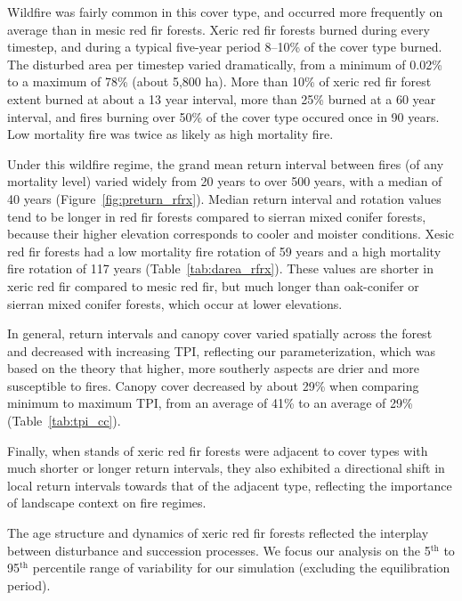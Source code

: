 Wildfire was fairly common in this cover type, and occurred more frequently on average than in mesic red fir forests. Xeric red fir forests burned during every timestep, and during a typical five-year period 8--10\% of the cover type burned. The disturbed area per timestep varied dramatically, from a minimum of 0.02\% to a maximum of 78\% (about 5,800 ha). More than 10\% of xeric red fir forest extent burned at about a 13 year interval, more than 25\% burned at a 60 year interval, and fires burning over 50\% of the cover type occured once in 90 years. Low mortality fire was twice as likely as high mortality fire.

Under this wildfire regime, the grand mean return interval between fires (of any mortality level) varied widely from 20 years to over 500 years, with a median of 40 years (Figure~\ref{fig:preturn_rfrx}). Median return interval and rotation values tend to be longer in red fir forests compared to sierran mixed conifer forests, because their higher elevation corresponds to cooler and moister conditions. Xesic red fir forests had a low mortality fire rotation of 59 years and a high mortality fire rotation of 117 years (Table~\ref{tab:darea_rfrx}). These values are shorter in xeric red fir compared to mesic red fir, but much longer than oak-conifer or sierran mixed conifer forests, which occur at lower elevations. 

In general, return intervals and canopy cover varied spatially across the forest and decreased with increasing TPI, reflecting our parameterization, which was based on the theory that higher, more southerly aspects are drier and more susceptible to fires. Canopy cover decreased by about 29\% when comparing minimum to maximum TPI, from an average of 41\% to an average of 29\% (Table~\ref{tab:tpi_cc}). 

Finally, when stands of xeric red fir forests were adjacent to cover types with much shorter or longer return intervals, they also exhibited a directional shift in local return intervals towards that of the adjacent type, reflecting the importance of landscape context on fire regimes.

The age structure and dynamics of xeric red fir forests reflected the interplay between disturbance and succession processes. We focus our analysis on the 5$^{\text{th}}$ to 95$^{\text{th}}$ percentile range of variability for our simulation (excluding the equilibration period).

